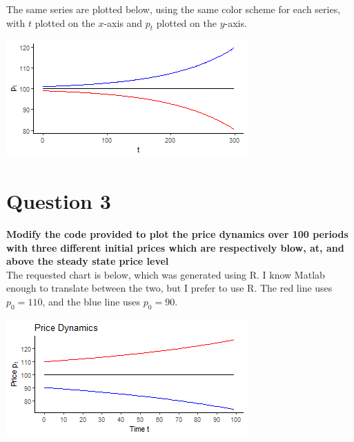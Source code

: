 \documentclass{article}
\begin{document}
The same series are plotted below, using the same color scheme for each series, with $t$ plotted on the $x$-axis and $p_t$ plotted on the $y$-axis.
\begin{center}
\includegraphics[scale=1]{problem2_timeplot.png}
\end{center}




\section*{Question 3}
\textbf{Modify the code provided to plot the price dynamics over 100 periods with three different initial prices which are respectively blow, at, and above the steady state price level}
\medskip \\
The requested chart is below, which was generated using R. I know Matlab enough to translate between the two, but I prefer to use R. The red line uses $p_0=110$, and the blue line uses $p_0=90$.
\begin{center}
\includegraphics[scale=1]{problem3_timeplot.png}
\end{center}


\end{document}
